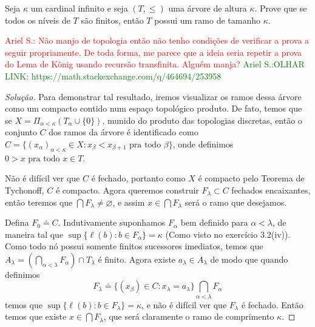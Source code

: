 \documentclass[a4paper]{article}
\begin{document}
  \begin{exercicio}
  Seja \(\kappa\) um cardinal infinito e seja \((T,\leq)\) uma árvore de altura
  $\kappa$. Prove que se todos os níveis de \(T\) são finitos, então \(T\)
  possui um ramo de tamanho $\kappa$.
\end{exercicio}
\textcolor{red}{Ariel S.: Não manjo de topologia então não tenho condições de
  verificar a prova a seguir propriamente. De toda forma, me parece que a ideia
  seria repetir a prova do Lema de König usando recursão transfinita.
  Alguém manja?}
\textcolor{green}{Ariel S.:OLHAR LINK: https://math.stackexchange.com/q/464694/253958 }

\begin{proof}[Solução]
  
  Para demonstrar tal resultado, iremos visualizar os ramos dessa árvore como um compacto contido num espaço topológico produto.
  De fato, temos que se \(X=\Pi_{\alpha<\kappa}(T_\alpha\cup\{0\})\), munido do produto das topologias discretas, então o conjunto \(C\) dos ramos da árvore é identificado como
  \(C=\{(x_\alpha)_{\alpha<\kappa}\in X : x_\beta<x_{\beta+1}\text{ pra todo }\beta\}\), onde definimos \(0>x\text{ pra todo }x\in T\).
  
  Não é difícil ver que \(C\) é fechado, portanto como \(X\) é compacto pelo Teorema de Tychonoff, \(C\) é compacto.
  Agora queremos construir \(F_\lambda\subset C\) fechados encaixantes, então teremos que \(\bigcap F_\lambda\neq\varnothing\), e assim \(x\in\bigcap F_\lambda\) será o ramo que desejamos.
  
  Defina \(F_0\doteq C\). Indutivamente suponhamos \(F_\alpha\) bem definido para \(\alpha<\lambda\), de maneira tal que \(\sup\{\ell(b):b\in F_\alpha\}=\kappa\) (Como visto no exercício 3.2(iv)).
  Como todo nó possui somente finitos sucessores imediatos, temos que \(A_\lambda=(\bigcap_{\alpha<\lambda} F_\alpha)\cap T_\lambda\) é finito. Agora existe \(a_\lambda\in A_\lambda\) de modo que quando definimos \[F_\lambda\doteq\{(x_\beta)\in C : x_\lambda=a_\lambda\}\bigcap_{\alpha<\lambda} F_\alpha\] temos que \(\sup\{\ell(b): b\in F_\lambda\}=\kappa\), e não é difícil ver que \(F_\lambda\) é fechado.
  Então temos que existe \(x\in\bigcap F_\lambda\), que será claramente o ramo de comprimento \(\kappa\).
  

\end{proof}
\end{document}
